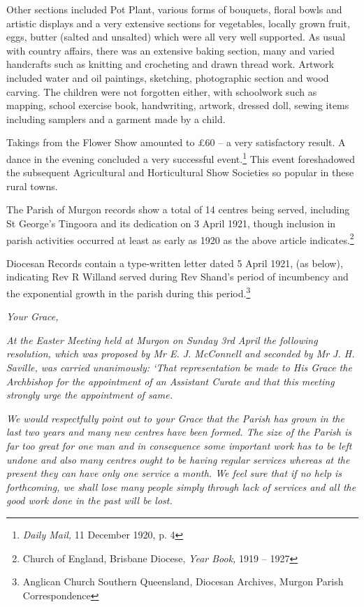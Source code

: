 Other sections included Pot Plant, various forms of bouquets, floral bowls and artistic displays and a very extensive sections for vegetables, locally grown fruit, eggs, butter (salted and unsalted) which were all very well supported. As usual with country affairs, there was an extensive baking section, many and varied handcrafts such as knitting and crocheting and drawn thread work. Artwork included water and oil paintings, sketching, photographic section and wood carving. The children were not forgotten either, with schoolwork such as mapping, school exercise book, handwriting, artwork, dressed doll, sewing items including samplers and a garment made by a child.



\balance


Takings from the Flower Show amounted to \pounds60 -- a very satisfactory result. A dance in the evening concluded a very successful event.\footnote{\emph{Daily Mail,} 11 December 1920, p. 4} This event foreshadowed the subsequent Agricultural and Horticultural Show Societies so popular in these rural towns.


The Parish of Murgon records show a total of 14 centres being served, including St George's Tingoora and its dedication on 3 April 1921, though inclusion in parish activities occurred at least as early as 1920 as the above article indicates.\footnote{Church of England, Brisbane Diocese, \emph{Year Book,} 1919 -- 1927}


Diocesan Records contain a type-written letter dated 5 April 1921, (as below), indicating Rev R Willand served during Rev Shand's period of incumbency and the exponential growth in the parish during this period.\footnote{Anglican Church Southern Queensland, Diocesan Archives, Murgon Parish Correspondence}


\smallskip


\emph{Your Grace,}



\emph{At the Easter Meeting held at Murgon on Sunday 3rd April the following resolution, which was proposed by Mr E. J. McConnell and seconded by Mr J. H. Saville, was carried unanimously: `That representation be made to His Grace the Archbishop for the appointment of an Assistant Curate and that this meeting strongly urge the appointment of same.}



\emph{We would respectfully point out to your Grace that the Parish has grown in the last two years and many new centres have been formed. The size of the Parish is far too great for one man and in consequence some important work has to be left undone and also many centres ought to be having regular services whereas at the present they can have only one service a month. We feel sure that if no help is forthcoming, we shall lose many people simply through lack of services and all the good work done in the past will be lost.}



